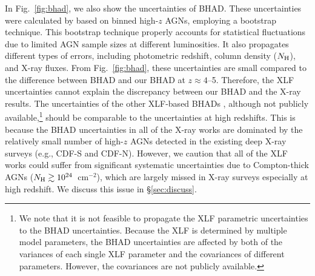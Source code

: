 \documentclass[twocolumn,twocolappendix,times]{aastex63}
\newcommand{\chandra}{{\it Chandra\/}}
\newcommand{\lx}{L_{\rm X}}
\newcommand{\fst}[1]{#1}
\begin{document}
\begin{CJK*}{UTF8}{gbsn}
\fst{In Fig.~\ref{fig:bhad}, we also show the uncertainties of \cite{vito18} BHAD.
These uncertainties were calculated by \cite{vito18} based on binned high-$z$ AGNs, employing a bootstrap technique. 
This bootstrap technique properly accounts for statistical fluctuations due to limited AGN sample sizes at different luminosities. 
It also propagates different types of errors, including photometric redshift, column density ($N_{\rm H}$), and X-ray fluxes. 
From Fig.~\ref{fig:bhad}, these uncertainties are small compared to the difference between \cite{vito18} BHAD and our BHAD at $z\approx 4$--5. 
Therefore, the XLF uncertainties cannot explain the discrepancy between our BHAD and the X-ray results. 
The uncertainties of the other XLF-based BHADs \citep{ueda14, aird15, ananna19}, although not publicly available,\footnote{\fst{We note that it is not feasible to propagate the XLF parametric uncertainties to the BHAD uncertainties.  
Because the XLF is determined by multiple model parameters, the BHAD uncertainties are affected by both of the variances of each single XLF parameter and the covariances of different parameters.
However, the covariances are not publicly available.}} 
should be comparable to the \cite{vito18} uncertainties at high redshifts.
This is because the BHAD uncertainties in all of the X-ray works are dominated by the relatively small number of high-$z$ AGNs detected in the existing deep X-ray surveys (e.g., CDF-S and CDF-N).
However, we caution that all of the XLF works could suffer from significant systematic uncertainties due to Compton-thick AGNs ($N_{\rm H}\gtrsim 10^{24}$~cm$^{-2}$), which are largely missed in X-ray surveys especially at high redshift. 
We discuss this issue in \S\ref{sec:discuss}.
}


\end{CJK*}
\end{document}

